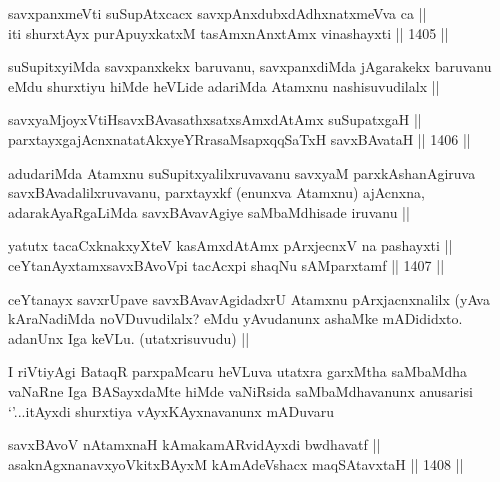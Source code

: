 
\begin{shl}
savxpanxmeVti suSupAtxcacx savxpAnxdubxdAdhxnatxmeVva ca || \\
iti shurxtAyx purA\s puyxkatxM tasAmxnAnx\s \s tAmx vinashayxti \hfill || 1405 ||  
\end{shl}

\begin{artha}
suSupitxyiMda savxpanxkekx baruvanu, savxpanxdiMda jAgarakekx baruvanu eMdu shurxtiyu hiMde heVLide adariMda Atamxnu nashisuvudilalx ||
\end{artha}


\begin{shl}
savxyaMjoyxVtiHsavxBAvasathxsatxsAmxdAtAmx suSupatxgaH || \\
parxtayxgajAcnxnatatAkxyeYRrasaMsapxqqSaTxH savxBAvataH \hfill || 1406 ||  
\end{shl}

\begin{artha}
adudariMda Atamxnu suSupitxyalilxruvavanu savxyaM parxkAshanAgiruva savxBAvadalilxruvavanu, parxtayxkf (enunxva Atamxnu) ajAcnxna, adarakAyaRgaLiMda savxBAvavAgiye saMbaMdhisade iruvanu ||
\end{artha}

\begin{shl}
yatutx tacaCxknakxyXteV kasAmxdAtAmx pArxjecnxV na pashayxti || \\
ceYtanAyxtamxsavxBAvoV\s pi tacAcxpi shaqNu sAMparxtamf \hfill || 1407 ||  
\end{shl}

\begin{artha}
ceYtanayx savxrUpave savxBAvavAgidadxrU Atamxnu pArxjacnxnalilx (yAva kAraNadiMda noVDuvudilalx? eMdu yAvudanunx ashaMke mADididxto. adanUnx Iga keVLu. (utatxrisuvudu) ||
\end{artha}

\begin{artha}
I riVtiyAgi BataqR parxpaMcaru heVLuva utatxra garxMtha saMbaMdha vaNaRne Iga BASayxdaMte hiMde vaNiRsida saMbaMdhavanunx anusarisi `\stext'...itAyxdi shurxtiya vAyxKAyxnavanunx mADuvaru
\end{artha}

\begin{shl}
savxBAvoV nA\s \s tamxnaH kAmakamARvidAyxdi bwdhavatf || \\
asaknAgxnanavxyoVkitxBAyxM kAmAdeVshacx maqSAtavxtaH \hfill || 1408 ||  
\end{shl}


